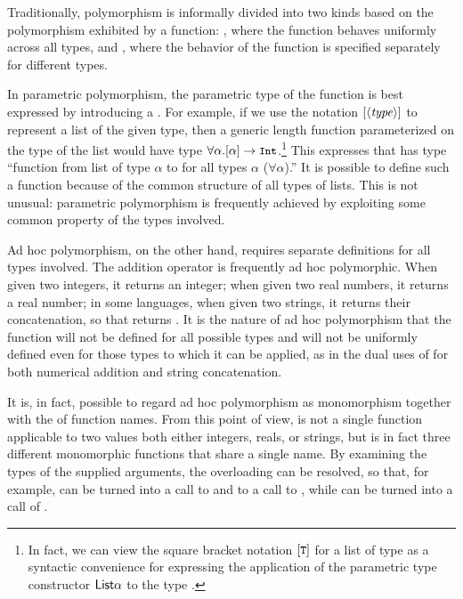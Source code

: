 Traditionally, polymorphism is informally divided into two kinds based on the polymorphism exhibited by a function: , where the function behaves uniformly across all types, and , where the behavior of the function is specified separately for different types.

In parametric polymorphism, the parametric type of the function is best expressed by introducing a . For example, if we use the notation $[\langle \text{\textit{type}} \rangle]$ to represent a list of the given type, then a generic length function parameterized on the type of the list would have type $\forall \alpha. [\alpha] \to \text{{\small\ttfamily Int}}$.\footnote{In fact, we can view the square bracket notation $[\text{{\small\ttfamily T}}\/]$ for a list of type  as a syntactic convenience for expressing the application of the parametric type constructor $\text{\textsf{List}} \alpha$ to the type .} This expresses that  has type ``function from list of type $\alpha$ to  for all types $\alpha$ ($\forall \alpha$).'' It is possible to define such a function because of the common structure of all types of lists. This is not unusual: parametric polymorphism is frequently achieved by exploiting some common property of the types involved.

Ad hoc polymorphism, on the other hand, requires separate definitions for all types involved. The addition operator \code{+} is frequently ad hoc polymorphic. When given two integers, it returns an integer; when given two real numbers, it returns a real number; in some languages, when given two strings, it returns their concatenation, so that  returns . It is the nature of ad hoc polymorphism that the function will not be defined for all possible types and will not be uniformly defined even for those types to which it can be applied, as in the dual uses of \code{+} for both numerical addition and string concatenation.

It is, in fact, possible to regard ad hoc polymorphism as monomorphism together with the  of function names. From this point of view, \code{+} is not a single function applicable to two values both either integers, reals, or strings, but is in fact three different monomorphic functions that share a single name. By examining the types of the supplied arguments, the overloading can be resolved, so that, for example,  can be turned into a call to  and  to a call to , while  can be turned into a call of .

